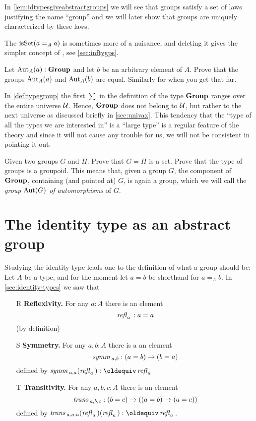 \begin{remark}
In \cref{lem:idtypesgiveabstractgroups} we will see that groups satisfy a set of laws justifying the name ``group''
and we will later show that groups are uniquely characterized by these laws.
\end{remark}
\begin{remark}
  The $\mathrm{isSet}(a=_Aa)$ is sometimes more of a nuisance, and deleting it gives the simpler concept of \aninftygp, see \cref{sec:inftygps}.
\end{remark}
\begin{xca}
   Let $\mathrm{Aut}_A(a):\mathbf{Group}$ and let $b$ be an arbitrary element of $A$.  Prove that the groups $\mathrm{Aut}_A(a)$ and $\mathrm{Aut}_A(b)$ are equal.  Similarly for \inftygps when you get that far.
\end{xca}
\begin{remark}\label{rem:monoidandabsgplarge}
 In \cref{def:typegroup} the first $\sum$ in the definition of the type $\mathbf{Group}$ ranges over the entire universe $\mathcal{U}$.  Hence, $\mathbf{Group}$ does not belong to $\mathcal{U}$, but rather to the next universe as discussed briefly in \cref{sec:univax}.   This tendency that the ``type of all the types we are interested in'' is a ``large type'' is a regular feature of the theory and since it will not cause any trouble for us, we will not be consistent in pointing it out.
  \end{remark}

  \begin{xca}\label{xca:typegroupisgroupoid}
    Given two groups $G$ and $H$.  Prove that $G=H$ is a set.   Prove that the type of groups is a groupoid.  This means that, given a group $G$, the component of $\mathbf{Group}$, containing (and pointed at) $G$, is again a group, which we will call the \emph{group $\mathrm{Aut}(G)$ of automorphisms} of $G$.
  \end{xca}

\section{The identity type as an abstract group }
\label{sec:identity-type-as-abstract}

Studying the identity type leads one to the definition of what a group should be:
Let $A$ be a type, and for the moment let $a=b$ be shorthand for $a=_Ab$.  In \cref{sec:identity-types} we saw that
\begin{enumerate}
\item[R] {\bf Reflexivity.} For any $a:A$ there is an element
$$\mathop{{\it refl}_{a}}{}:a=a$$ (by definition)
\item[S] {\bf Symmetry.} For any $a,b:A$ there is a an element $$\mathop{\mathit{symm}}{}_{a,b}:(a=b)\to (b=a)$$ defined by $\symm{}_{a,a}(\refl a{})\defequi\refl a{}$
\item[T] {\bf Transitivity.} For any $a,b,c:A$ there is an element $$\mathop{\mathit{trans}}{}_{a,b,c}:(b=c)\to((a=b)\to(a=c))$$ defined by $\trans{}_{a,a,a}(\refl a{})(\refl a{})\defequi \refl a{}$.
\end{enumerate}

